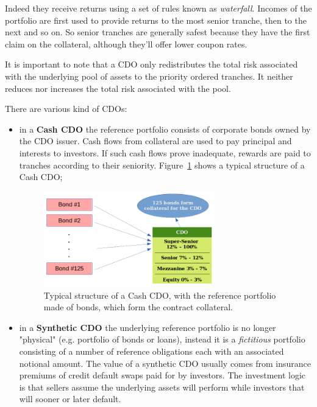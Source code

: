 Indeed they receive returns using a set of rules known as \emph{waterfall}. Incomes of the portfolio are first used to provide returns to the most senior tranche, then to the next and so on. So senior tranches are generally safest because they have the first claim on the collateral, although they'll offer lower coupon rates.

It is important to note that a CDO only redistributes the total risk associated with the underlying pool of assets to the priority ordered tranches. It neither reduces nor increases the total risk associated with the pool.

There are various kind of CDOs:
\begin{itemize}
	\item in a \textbf{Cash CDO} the reference portfolio consists of corporate bonds owned by the CDO issuer. Cash flows from collateral are used to pay principal and interests to investors. If such cash flows prove inadequate, rewards are paid to tranches according to their seniority. Figure~\ref{fig:cdo_structure} shows a typical structure of a Cash CDO;

\begin{figure}[htb]
	\centering
	\includegraphics[width=0.7\textwidth]{figures/cdo_structure}
	\caption{Typical structure of a Cash CDO, with the reference portfolio made of bonds,
		which form the contract collateral.}
	\label{fig:cdo_structure}
\end{figure}

	\item in a \textbf{Synthetic CDO} the underlying reference portfolio is no longer "physical" (e.g. portfolio of bonds or loans), instead it is a \emph{fictitious} portfolio consisting of a number of reference obligations each with an associated notional amount. The value of a synthetic CDO usually comes from insurance premiums of credit default swaps paid for by investors. The investment logic is that sellers assume the underlying assets will perform while investors that will sooner or later default.
\end{itemize}

